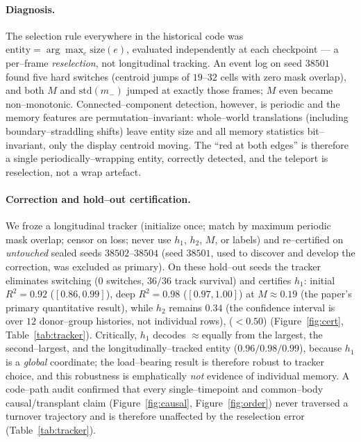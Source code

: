 \documentclass[11pt]{article}
\begin{document}
\paragraph{Diagnosis.} The selection rule everywhere in the historical code was
$\text{entity}=\arg\max_e \text{size}(e)$, evaluated independently at each checkpoint --- a per--frame
\emph{reselection}, not longitudinal tracking. An event log on seed $38501$ found five hard switches (centroid jumps
of $19$--$32$ cells with zero mask overlap), and both $M$ and $\mathrm{std}(m_-)$ jumped at exactly those frames;
$M$ even became non--monotonic. Connected--component detection, however, is periodic and the memory features are
permutation--invariant: whole--world translations (including boundary--straddling shifts) leave entity size and all
memory statistics bit--invariant, only the display centroid moving. The ``red at both edges'' is therefore a single
periodically--wrapping entity, correctly detected, and the teleport is reselection, not a wrap artefact.

\paragraph{Correction and hold--out certification.} We froze a longitudinal tracker (initialize once; match by
maximum periodic mask overlap; censor on loss; never use $h_1$, $h_2$, $M$, or labels) and re--certified on
\emph{untouched} sealed seeds $38502$--$38504$ (seed $38501$, used to discover and develop the correction, was
excluded as primary). On these hold--out seeds the tracker eliminates switching ($0$ switches, $36/36$ track
survival) and certifies $h_1$: initial $R^2=0.92$ ($[0.86,0.99]$), deep $R^2=0.98$ ($[0.97,1.00]$) at $M\approx0.19$ (the paper's primary quantitative result),
while $h_2$ remains $0.34$ (the confidence interval is over $12$ donor--group histories, not individual rows), ($<0.50$) (Figure~\ref{fig:cert}, Table~\ref{tab:tracker}). Critically, $h_1$ decodes
$\approx$equally from the largest, the second--largest, and the longitudinally--tracked entity ($0.96/0.98/0.99$),
because $h_1$ is a \emph{global} coordinate; the load--bearing result is therefore robust to tracker choice, and
this robustness is emphatically \emph{not} evidence of individual memory. A code--path audit confirmed that every
single--timepoint and common--body causal/transplant claim (Figure~\ref{fig:causal}, Figure~\ref{fig:order}) never
traversed a turnover trajectory and is therefore unaffected by the reselection error (Table~\ref{tab:tracker}).
\end{document}
